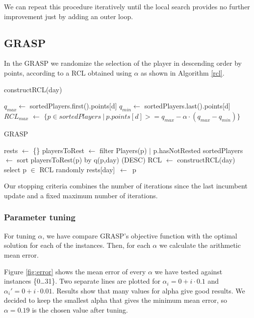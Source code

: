 \documentclass[a4paper, 10pt]{article}
\begin{document}
We can repeat this procedure iteratively until the local search provides no further improvement just by adding an outer loop.


\clearpage
\subsection{GRASP}

In the GRASP we randomize the selection of the player in descending order by points, according to a RCL obtained using $\alpha$ as shown in Algorithm \ref{rcl}.


\begin{algorithm}
    \caption{constructRCL(day)} 
    \label{rcl}
    \begin{algorithmic}[1]
	\State $q_{max} \leftarrow $ sortedPlayers.first().points[d]
	\State $q_{min} \leftarrow$ sortedPlayers.last().points[d]
	\State $RCL_{max}$ $\leftarrow$ $\{p \in sortedPlayers\ |\ p.points[d] >= q_{max} - \alpha \cdot (q_{max} - q_{min})\}$
    \end{algorithmic} 
\end{algorithm}




\begin{algorithm}
	\caption{GRASP} 
	\begin{algorithmic}[1]
	  \State rests $\leftarrow$ \{\}
        \State playersToRest $\leftarrow$ filter Players(p) $|$ p.hasNotRested
        \State sortedPlayers $\leftarrow$ sort playersToRest(p) by q(p,day) (DESC)
	      \State RCL $\leftarrow$ constructRCL(day)
	      \State select p $\in$ RCL randomly
	      \State rests[day]\ $\leftarrow$\ p
	    \EndFor
	\end{algorithmic} 
\end{algorithm}

Our stopping criteria combines the number of iterations since the last incumbent update and a fixed maximum number of iterations.


\subsubsection{Parameter tuning} 

For tuning $\alpha$, we have compare GRASP's objective function with the optimal solution for each of the instances. Then, for each $\alpha$ we calculate the arithmetic mean error. 

Figure \ref{fig:error} shows the mean error of every $\alpha$ we have tested against instances \{0\dots31\}. Two separate lines are plotted for $\alpha_i = 0 + i \cdot 0.1$ and $\alpha_i' = 0 + i \cdot 0.01$. Results show that many values for alpha give good results. We decided to keep the smallest alpha that gives the minimum mean error, so $\alpha = 0.19$ is the chosen value after tuning.
\end{document}
